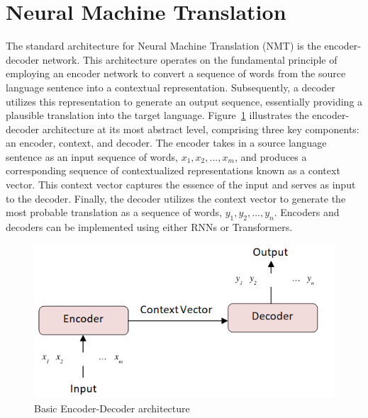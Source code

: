 \section{Neural Machine Translation}
The standard architecture for Neural Machine Translation (NMT) is the encoder-decoder network. 
This architecture operates on the fundamental principle of employing an encoder network to convert a sequence of words from the source language sentence into a contextual representation. 
Subsequently, a decoder utilizes this representation to generate an output sequence, essentially providing a plausible translation into the target language. 
Figure~\ref{fig:encoder-decoder} illustrates the encoder-decoder architecture at its most abstract level, comprising three key components: an encoder, context, and decoder. 
The encoder takes in a source language sentence as an input sequence of words, $x_1, x_2, ..., x_m$, and produces a corresponding sequence of contextualized representations known as a context vector. 
This context vector captures the essence of the input and serves as input to the decoder. 
Finally, the decoder utilizes the context vector to generate the most probable translation as a sequence of words, $y_1, y_2, ..., y_n$. 
Encoders and decoders can be implemented using either RNNs or Transformers.
\begin{figure}[h]
	\centering
	\includegraphics[width=0.7\linewidth]{Figures/Encoder-Decoder}
	\caption{Basic Encoder-Decoder architecture}
	\label{fig:encoder-decoder}
\end{figure}


